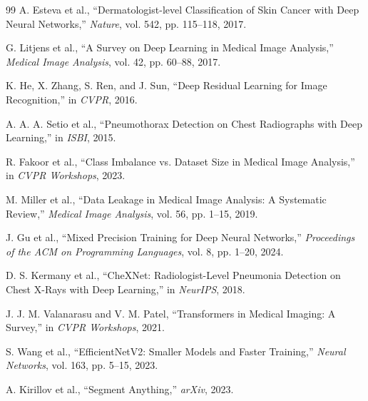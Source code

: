 \documentclass[conference,a4paper]{IEEEtran}
\begin{document}
\begin{thebibliography}{99}
A. Esteva et al., ``Dermatologist-level Classification of Skin Cancer with Deep Neural Networks,'' \emph{Nature}, vol. 542, pp. 115--118, 2017.

G. Litjens et al., ``A Survey on Deep Learning in Medical Image Analysis,'' \emph{Medical Image Analysis}, vol. 42, pp. 60--88, 2017.

K. He, X. Zhang, S. Ren, and J. Sun, ``Deep Residual Learning for Image Recognition,'' in \emph{CVPR}, 2016.

A. A. A. Setio et al., ``Pneumothorax Detection on Chest Radiographs with Deep Learning,'' in \emph{ISBI}, 2015.

R. Fakoor et al., ``Class Imbalance vs. Dataset Size in Medical Image Analysis,'' in \emph{CVPR Workshops}, 2023.

M. Miller et al., ``Data Leakage in Medical Image Analysis: A Systematic Review,'' \emph{Medical Image Analysis}, vol. 56, pp. 1--15, 2019.

J. Gu et al., ``Mixed Precision Training for Deep Neural Networks,'' \emph{Proceedings of the ACM on Programming Languages}, vol. 8, pp. 1--20, 2024.

D. S. Kermany et al., ``CheXNet: Radiologist-Level Pneumonia Detection on Chest X-Rays with Deep Learning,'' in \emph{NeurIPS}, 2018.

J. J. M. Valanarasu and V. M. Patel, ``Transformers in Medical Imaging: A Survey,'' in \emph{CVPR Workshops}, 2021.

S. Wang et al., ``EfficientNetV2: Smaller Models and Faster Training,'' \emph{Neural Networks}, vol. 163, pp. 5--15, 2023.

A. Kirillov et al., ``Segment Anything,'' \emph{arXiv}, 2023.

\end{thebibliography}
\end{document}
